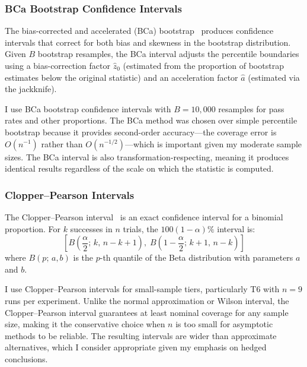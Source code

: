 \documentclass[11pt]{article}
\begin{document}
\subsubsection{BCa Bootstrap Confidence Intervals}
\label{sec:bca_bootstrap}

The bias-corrected and accelerated (BCa) bootstrap~\cite{efron1987better}
produces confidence intervals that correct for both bias and skewness in the
bootstrap distribution. Given $B$ bootstrap resamples, the BCa interval
adjusts the percentile boundaries using a bias-correction factor $\hat{z}_0$
(estimated from the proportion of bootstrap estimates below the original
statistic) and an acceleration factor $\hat{a}$ (estimated via the jackknife).

I use BCa bootstrap confidence intervals with $B = 10{,}000$ resamples for
pass rates and other proportions. The BCa method was chosen over simple
percentile bootstrap because it provides second-order accuracy---the coverage
error is $O(n^{-1})$ rather than $O(n^{-1/2})$---which is important given my
moderate sample sizes. The BCa interval is also transformation-respecting,
meaning it produces identical results regardless of the scale on which the
statistic is computed.

\subsubsection{Clopper--Pearson Intervals}
\label{sec:clopper_pearson}

The Clopper--Pearson interval~\cite{clopper1934use} is an exact confidence
interval for a binomial proportion. For $k$ successes in $n$ trials, the
$100(1-\alpha)\%$ interval is:
\begin{equation}
  \left[B\!\left(\frac{\alpha}{2};\, k,\, n-k+1\right),\;
        B\!\left(1-\frac{\alpha}{2};\, k+1,\, n-k\right)\right]
\end{equation}
where $B(p;\, a, b)$ is the $p$-th quantile of the Beta distribution with
parameters $a$ and $b$.

I use Clopper--Pearson intervals for small-sample tiers, particularly T6 with
$n = 9$ runs per experiment. Unlike the normal approximation or Wilson interval,
the Clopper--Pearson interval guarantees at least nominal coverage for any
sample size, making it the conservative choice when $n$ is too small for
asymptotic methods to be reliable. The resulting intervals are wider than
approximate alternatives, which I consider appropriate given my emphasis on
hedged conclusions.
\end{document}
